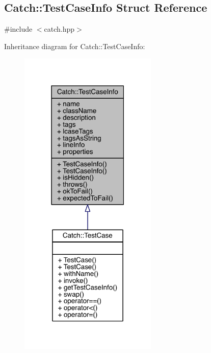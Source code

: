 \hypertarget{a00086}{}\subsection{Catch\+:\+:Test\+Case\+Info Struct Reference}
\label{a00086}


{\ttfamily \#include $<$catch.\+hpp$>$}



Inheritance diagram for Catch\+:\+:Test\+Case\+Info\+:\nopagebreak
\begin{figure}[H]
\begin{center}
\leavevmode
\includegraphics[width=186pt]{a00286}
\end{center}
\end{figure}


